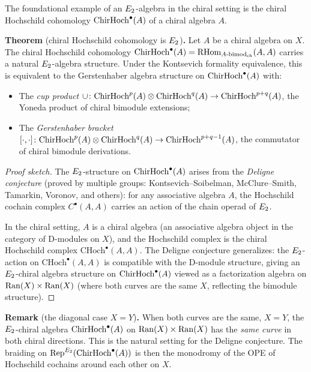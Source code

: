 The foundational example of an $E_2$-algebra in the chiral setting
is the chiral Hochschild cohomology $\mathrm{ChirHoch}^\bullet(A)$ of a chiral
algebra $A$.

\medskip
\noindent\textbf{Theorem} (chiral Hochschild cohomology is $E_2$)\textbf{.}\;
Let $A$ be a chiral algebra on $X$. The chiral Hochschild cohomology
$\mathrm{ChirHoch}^\bullet(A) = \mathrm{RHom}_{A\text{-}\mathrm{bimod}_{\mathrm{ch}}}(A, A)$ carries a
natural $E_2$-algebra structure. Under the Kontsevich formality
equivalence, this is equivalent to the Gerstenhaber algebra structure
on $\mathrm{ChirHoch}^\bullet(A)$ with:
\begin{itemize}
 \item The \emph{cup product} $\cup\colon \mathrm{ChirHoch}^p(A) \otimes
 \mathrm{ChirHoch}^q(A) \to \mathrm{ChirHoch}^{p+q}(A)$, the Yoneda product of chiral bimodule
 extensions;
 \item The \emph{Gerstenhaber bracket}
 $[\cdot, \cdot]\colon \mathrm{ChirHoch}^p(A) \otimes \mathrm{ChirHoch}^q(A) \to
 \mathrm{ChirHoch}^{p+q-1}(A)$, the commutator of chiral bimodule derivations.
\end{itemize}

\begin{proof}[Proof sketch]
The $E_2$-structure on $\mathrm{ChirHoch}^\bullet(A)$ arises from the
\emph{Deligne conjecture} (proved by multiple groups: Kontsevich--Soibelman,
McClure--Smith, Tamarkin, Voronov, and others): for any associative
algebra $A$, the Hochschild cochain complex $C^\bullet(A, A)$ carries
an action of the chain operad of $E_2$.

In the chiral setting, $A$ is a chiral algebra (an associative algebra
object in the category of D-modules on $X$), and the Hochschild complex
is the chiral Hochschild complex $\mathrm{CHoch}^\bullet(A, A)$. The
Deligne conjecture generalizes: the $E_2$-action on
$\mathrm{CHoch}^\bullet(A, A)$ is compatible with the D-module structure,
giving an $E_2$-chiral algebra structure on $\mathrm{ChirHoch}^\bullet(A)$ viewed
as a factorization algebra on $\mathrm{Ran}(X) \times \mathrm{Ran}(X)$ (where both
curves are the same $X$, reflecting the bimodule structure).
\end{proof}

\medskip
\noindent\textbf{Remark} (the diagonal case $X = Y$)\textbf{.}
When both curves are the same, $X = Y$, the $E_2$-chiral algebra
$\mathrm{ChirHoch}^\bullet(A)$ on $\mathrm{Ran}(X) \times \mathrm{Ran}(X)$ has the
\emph{same curve} in both chiral directions. This is the natural
setting for the Deligne conjecture. The braiding on
$\mathrm{Rep}^{E_2}(\mathrm{ChirHoch}^\bullet(A))$ is then the monodromy of the OPE of
Hochschild cochains around each other on $X$.


